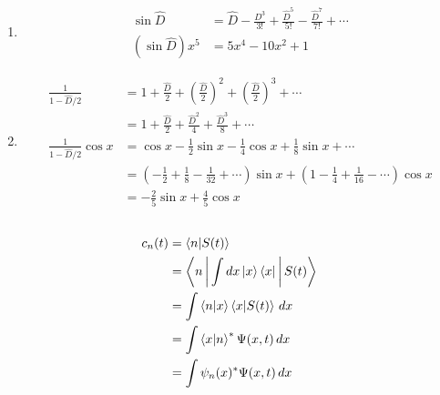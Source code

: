 \documentclass{article}
\begin{document}
\subsection{}

\begin{enumerate}
  \item

        \begin{align*}
          \sin \hat{D}       & = \hat{D} - \frac{D^3}{3!} + \frac{\hat{D}^5}{5!} - \frac{\hat{D}^7}{7!} + \cdots \\
          (\sin \hat{D}) x^5 & = 5 x^4 - 10 x^2 + 1
        \end{align*}

  \item

        \begin{align*}
          \frac{1}{1 - \hat{D} / 2}        & = 1 + \frac{\hat{D}}{2} + \left( \frac{\hat{D}}{2} \right)^2 + \left( \frac{\hat{D}}{2} \right)^3 + \cdots                                 \\
                                           & = 1 + \frac{\hat{D}}{2} + \frac{\hat{D}^2}{4} + \frac{\hat{D}^3}{8} + \cdots                                                               \\
          \frac{1}{1 - \hat{D} / 2} \cos x & = \cos x - \frac{1}{2} \sin x - \frac{1}{4} \cos x + \frac{1}{8} \sin x + \cdots                                                           \\
                                           & = \left( -\frac{1}{2} + \frac{1}{8} - \frac{1}{32} + \cdots \right) \sin x + \left( 1 - \frac{1}{4} + \frac{1}{16} - \cdots \right) \cos x \\
                                           & = -\frac{2}{5} \sin x + \frac{4}{5} \cos x
        \end{align*}
\end{enumerate}

\setcounter{subsection}{29}
\subsection{}

\begin{align*}
  c_n(t) & = \braket{n | S(t)}                            \\
         & = \Braket{n | \int d x \Ket{x} \Bra{x} | S(t)} \\
         & = \int \braket{n | x} \braket{x | S(t)} \,d x  \\
         & = \int \braket{x | n}^* \Psi(x, t) \,d x       \\
         & = \int \psi_n(x)^* \Psi(x, t) \,d x
\end{align*}
\end{document}
